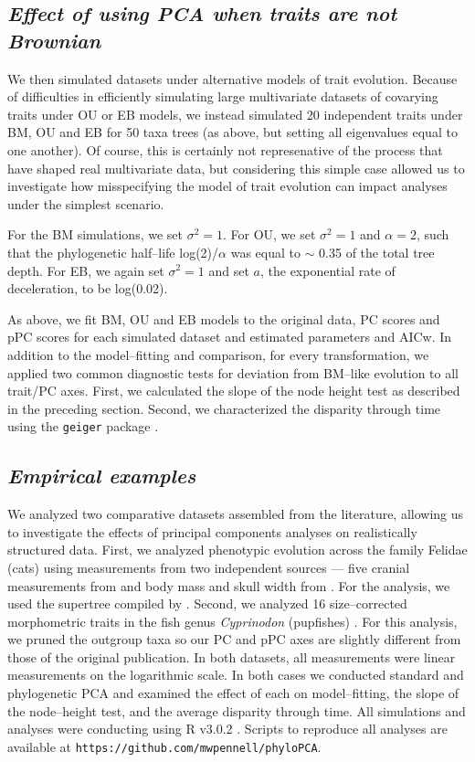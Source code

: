 \documentclass[a4paper,11pt]{article}
\begin{document}
\subsection{\emph{Effect of using PCA when traits are not Brownian}}
We then simulated datasets under alternative  models of trait evolution. Because of difficulties in efficiently simulating large multivariate datasets of covarying traits under OU or EB models, we instead simulated 20 independent traits under BM, OU and EB for 50 taxa trees (as above, but setting all eigenvalues equal to one another). Of course, this is certainly not represenative of the process that have shaped real multivariate data, but considering this simple case allowed us to investigate how misspecifying the model of trait evolution can impact analyses under the simplest scenario.

For the BM simulations, we set $\sigma^2=\text{1}$. For OU, we set $\sigma^2=\text{1}$ and $\alpha=\text{2}$, such that the phylogenetic half--life log(2)/$\alpha$ \citep{Hansen2008} was equal to $\sim$ 0.35 of the total tree depth. For EB, we again set $\sigma^2=\text{1}$ and set $a$, the exponential rate of deceleration, to be log(0.02). 

As above, we fit BM, OU and EB models to the original data, PC scores and pPC scores for each simulated dataset and estimated parameters and AICw. In addition to the model--fitting and comparison, for every transformation, we applied two common diagnostic tests for deviation from BM--like evolution to all trait/PC axes. First, we calculated the slope of the node height test as described in the preceding section. Second, we characterized the disparity through time \citep{Harmon2003} using the \texttt{geiger} package \citep{geiger2}. 


\subsection{\emph{Empirical examples}}
We analyzed two comparative datasets assembled from the literature, allowing us to investigate the effects of principal components analyses on realistically structured data. First, we analyzed phenotypic evolution across the family Felidae (cats) using measurements from two independent sources --- five cranial measurements from \cite{slater_2009} and body mass and skull width from \cite{sakamoto_2010}. For the analysis, we used the supertree compiled by \cite{Nyakatura_2012}. Second, we analyzed 16 size--corrected morphometric traits in the fish genus \textit{Cyprinodon} (pupfishes) \citep{Martin2011}. For this analysis, we pruned the outgroup taxa so our PC and pPC axes are slightly different from those of the original publication. In both datasets, all measurements were linear measurements on the logarithmic scale. In both cases we conducted standard and phylogenetic PCA and examined the effect of each on model--fitting, the slope of the node--height test, and the average disparity through time. All simulations and analyses were conducting using R v3.0.2 \citep{R}. Scripts to reproduce all analyses are available at \texttt{https://github.com/mwpennell/phyloPCA}.
  
\end{document}
